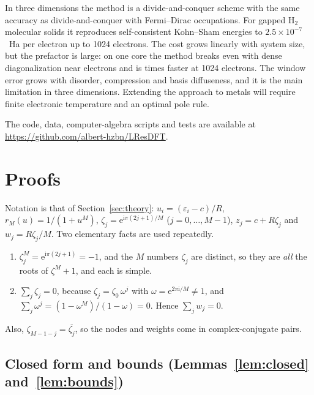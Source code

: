 \documentclass[aps,prb,twocolumn,superscriptaddress,floatfix,longbibliography]{revtex4-2}
\theoremstyle{remark}
\newcommand{\ee}{\mathrm{e}}
\newcommand{\ii}{\mathrm{i}}
\begin{document}
In three dimensions the method is a divide-and-conquer scheme with the same accuracy as divide-and-conquer with
Fermi--Dirac occupations. For gapped H$_2$ molecular solids it reproduces self-consistent Kohn--Sham energies to
$2.5\times10^{-7}$~Ha per electron up to 1024 electrons. The cost grows linearly with system size, but the prefactor is
large: on one core the method breaks even with dense diagonalization near  electrons and is
 times faster at 1024 electrons. The window error grows with disorder, compression and basis
diffuseness, and it is the main limitation in three dimensions. Extending the approach to metals will require finite
electronic temperature and an optimal pole rule.

\begin{acknowledgments}
The code, data, computer-algebra scripts and tests are available at \url{https://github.com/albert-hzbn/LResDFT}.
\end{acknowledgments}

\appendix

\section{Proofs}\label{app:proofs}

Notation is that of Section~\ref{sec:theory}: $u_i=(\varepsilon_i-c)/R$, $r_M(u)=1/(1+u^M)$, $\zeta_j=\ee^{\ii\pi(2j+1)/M}$
($j=0,\dots,M-1$), $z_j=c+R\zeta_j$ and $w_j=R\zeta_j/M$. Two elementary facts are used repeatedly.
\begin{enumerate}
\item[(F1)] $\zeta_j^M=\ee^{\ii\pi(2j+1)}=-1$, and the $M$ numbers $\zeta_j$ are distinct, so they are \emph{all} the roots of
$\zeta^M+1$, and each is simple.
\item[(F2)] $\sum_j\zeta_j=0$, because $\zeta_j=\zeta_0\,\omega^{j}$ with $\omega=\ee^{2\pi\ii/M}\neq1$, and
$\sum_j\omega^j=(1-\omega^M)/(1-\omega)=0$. Hence $\sum_jw_j=0$.
\end{enumerate}
Also, $\zeta_{M-1-j}=\overline{\zeta_j}$, so the nodes and weights come in complex-conjugate pairs.

\subsection{Closed form and bounds (Lemmas~\ref{lem:closed} and~\ref{lem:bounds})}
\end{document}
